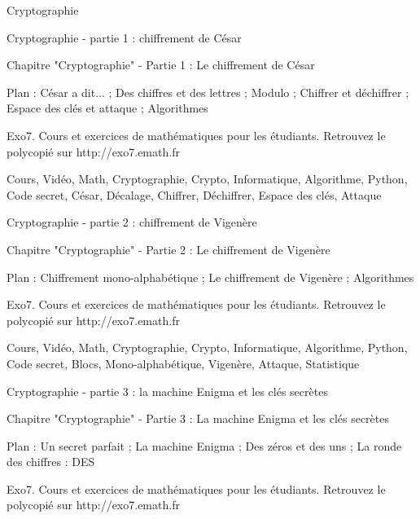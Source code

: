 
   Cryptographie




Cryptographie - partie 1 : chiffrement de César



Chapitre "Cryptographie" - Partie 1 : Le chiffrement de César

Plan : César a dit... ; Des chiffres et des lettres ; Modulo ;
Chiffrer et déchiffrer ; Espace des clés et attaque ; Algorithmes

Exo7. Cours et exercices de mathématiques pour les étudiants.
Retrouvez le polycopié sur http://exo7.emath.fr


Cours, Vidéo, Math, Cryptographie, Crypto,  Informatique, Algorithme, Python, Code secret, César, Décalage,
Chiffrer, Déchiffrer, Espace des clés, Attaque



Cryptographie - partie 2 : chiffrement de Vigenère



Chapitre "Cryptographie" - Partie 2 : Le chiffrement de Vigenère

Plan : Chiffrement mono-alphabétique ;  Le chiffrement de Vigenère ;
Algorithmes

Exo7. Cours et exercices de mathématiques pour les étudiants.
Retrouvez le polycopié sur http://exo7.emath.fr


Cours, Vidéo, Math, Cryptographie, Crypto,  Informatique, Algorithme, Python, Code secret, 
Blocs, Mono-alphabétique, Vigenère, Attaque, Statistique



Cryptographie - partie 3 : la machine Enigma et les clés secrètes



Chapitre "Cryptographie" - Partie 3 : La machine Enigma et les clés secrètes

Plan : Un secret parfait ; La machine Enigma ; Des zéros et des uns ; La ronde des chiffres : DES

Exo7. Cours et exercices de mathématiques pour les étudiants.
Retrouvez le polycopié sur http://exo7.emath.fr

